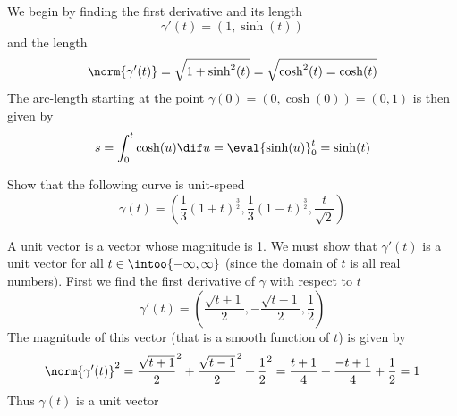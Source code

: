     \begin{solution}
        We begin by finding the first derivative and its length
            \[
\gamma'(t) = (1, \sinh(t))
\]
        and the length
            \[
\norm{\gamma'(t)} = \sqrt{1 + \sinh^{2}(t)} = \sqrt{\cosh^{2}(t) = \cosh(t)}
\]
        The arc-length starting at the point \(\gamma(0) = (0, \cosh(0)) = (0, 1)\) is then given by
            \[
s = \int_{0}^{t} \cosh(u) \dif u = \eval{\sinh(u)}_{0}^{t} = \sinh(t)
\]
    \end{solution}

    \begin{problem}
        Show that the following curve is unit-speed
            \[
\gamma(t) = (\frac{1}{3} (1 + t)^{\frac{3}{2}}, \frac{1}{3} (1 - t)^{\frac{3}{2}}, \frac{t}{\sqrt{2}})
\]
    \end{problem}

    \begin{solution}
A unit vector is a vector whose magnitude is 1. We must show that \(\gamma'(t)\) is a unit vector for all \(t \in \intoo{-\infty, \infty}\) (since the domain of \(t\) is all real numbers). First we find the first derivative of \(\gamma\) with respect to \(t\)
            \[
\gamma'(t) = (\frac{\sqrt{t + 1}}{2}, -\frac{\sqrt{t - 1}}{2}, \frac{1}{2})
\]
        The magnitude of this vector (that is a smooth function of \(t\)) is given by
            \[
\norm{\gamma'(t)}^{2} = \frac{\sqrt{t + 1}}{2}^{2} + \frac{\sqrt{t - 1}}{2}^{2} + \frac{1}{2}^{2} = \frac{t + 1}{4} + \frac{-t + 1}{4} + \frac{1}{2} = 1
\]
        Thus \(\gamma(t)\) is a unit vector
      \end{solution}

